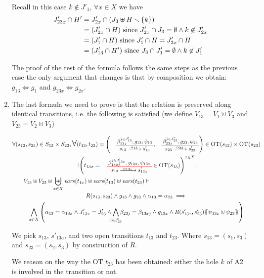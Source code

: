 \documentclass[runningheads]{llncs}
\begin{document}
\begin{enumerate}
Recall in this case $k \notin J'_1$, $\forall x \in X$ we have
\begin{align*}		
J'_{23x} \cap H' & = J'_{2x}  \cap {\left(J_3 \uplus H \smallsetminus{\left\{k\right\}}\right)} \\
& = {\left(J'_{2x}\cap H \right)} \text{ since } J'_{2x}\cap J_3=\emptyset \land k\not\in J'_{2x} \\
& = {\left(J'_1\cap H \right)} \text{ since } J'_1 \cap H = J'_{2x} \cap H\\
& = {\left(J'_{13}\cap H' \right)} \text{ since } J_3\cap J'_1=\emptyset \land k\not\in J_1'
\end{align*}

The proof of the rest of the formula follows the same steps as the previous case the only argument that changes is that by composition we obtain:  $g_{13} \Leftrightarrow g_1$ and
$g_{23x}  \Leftrightarrow g_{2x}$.\\


\item The last formula we need to prove is that the relation is preserved along identical transitions, i.e. the following is satisfied (we define $V_{13} = V_1 \uplus V_3$ and $ V_{23} = V_2\uplus V_3$) 

\begin{multline*}
\forall \mpar{s_{13}, s_{23}} \in S_{13} \times S_{23}, \bigsymb{\forall} \mpar{t_{13}, t_{23}} = \mpar{\OTx{13}{}{13}{13}, \OTx{23}{}{23}{23}} \in \fOT{s_{13}} \times \fOT{s_{23}} \\ 
\exists 
\mpar{t_{13x} = \OTx{13}{x}{13x}{13x} \in \fOT{s_{13}}}^{x \in X},\\
 V_{13} \uplus V_{23} \uplus  \biguplus_{x\in X}\fvars{t_{1x}}  \uplus \fvars{t_{13}} \uplus \fvars{t_{23}} 
\vdash \hspace{6cm}\\  R\mpar{s_{13}, s_{23}} \wedge 	g_{13} \wedge g_{23} \wedge \alpha_{13} = \alpha_{23} 
\implies \\
\bigwedge_{x\in X}
\mpar{
 \alpha_{13}=\alpha_{1 3x} \land
J'_{13x}  = J'_{23}  \land \bigwedge_\subbox{j \in  J'_{23}} \beta_{23j} = \beta_{13xj}\land g_{1 3x} \land
 R\mpar{s'_{1 3x}, s'_{23}}\psubst{\psi_{1 3x} \uplus \psi_{23}}}
\end{multline*}

We pick $s_{13}$, $s'_{13a}$, and two open transitions $t_{13}$ and $t_{23}$.
Where $s_{13}=(s_1,s_3)$ and $s_{23}=(s_2,s_3)$ by construction of $R$.


We reason on the way the OT $t_{23}$ has been obtained: either the hole $k$ of A2 is involved in the transition or not.


\end{enumerate}
\end{document}
